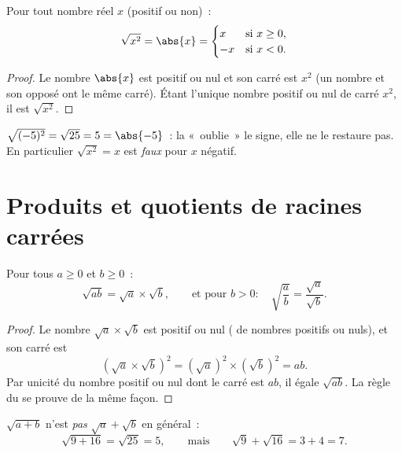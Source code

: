 \begin{proposition}\label{prop:g9:sqrt:square}
Pour tout nombre réel $x$ (positif ou non)~:
\[
\sqrt{x^2} = \abs{x} =
\begin{cases}
x & \text{si } x \geq 0,\\
-x & \text{si } x < 0 .
\end{cases}
\]
\end{proposition}

\begin{proof}
Le nombre $\abs{x}$ est positif ou nul et son carré est $x^2$ (un
nombre et son opposé ont le même carré). Étant l'unique nombre positif
ou nul de carré $x^2$, il est $\sqrt{x^2}$.
\end{proof}

\begin{example}
$\sqrt{(-5)^2} = \sqrt{25} = 5 = \abs{-5}$~: la  «~oublie~»
le signe, elle ne le restaure pas. En particulier $\sqrt{x^2} = x$ est
\emph{faux} pour $x$ négatif.
\end{example}

\section{Produits et quotients de racines carrées}

\begin{theorem}\label{thm:g9:sqrt:rules}
Pour tous $a \geq 0$ et $b \geq 0$~:
\[
\sqrt{a b} = \sqrt a \times \sqrt b,
\qquad\text{et pour } b > 0:\quad
\sqrt{\frac ab} = \frac{\sqrt a}{\sqrt b} .
\]
\end{theorem}

\begin{proof}
Le nombre $\sqrt a \times \sqrt b$ est positif ou nul ( de
nombres positifs ou nuls), et son carré est
\[
\left(\sqrt a \times \sqrt b\right)^2
= \left(\sqrt a\right)^2 \times \left(\sqrt b\right)^2
= a b .
\]
Par unicité du nombre positif ou nul dont le carré est $ab$, il égale
$\sqrt{ab}$. La règle du  se prouve de la même façon.
\end{proof}

\begin{remark}
$\sqrt{a + b}$ n'est \emph{pas} $\sqrt a + \sqrt b$ en général~:
\[
\sqrt{9 + 16} = \sqrt{25} = 5,
\qquad\text{mais}\qquad
\sqrt 9 + \sqrt{16} = 3 + 4 = 7 .
\]
\end{remark}

